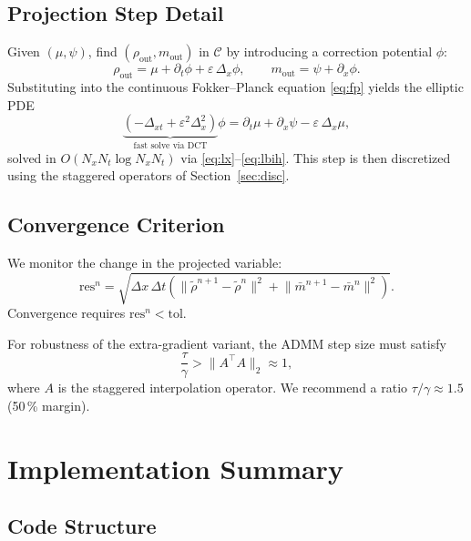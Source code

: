 \documentclass[11pt]{article}
\newcommand{\Dx}{\Delta_x}          %
\newcommand{\Dxt}{\Delta_{xt}}      %
\begin{document}
\subsection{Projection Step Detail}

Given $(\mu,\psi)$, find $(\rho_{\text{out}}, m_{\text{out}})$ in
$\mathcal{C}$ by introducing a correction potential $\phi$:
%
\begin{equation}
  \rho_{\text{out}} = \mu + \partial_t\phi + \varepsilon\,\Dx\phi,
  \qquad
  m_{\text{out}}   = \psi + \partial_x\phi.
\end{equation}
%
Substituting into the continuous Fokker--Planck equation \eqref{eq:fp}
yields the elliptic PDE
%
\begin{equation}\label{eq:phi_pde}
  \underbrace{(-\Dxt + \varepsilon^2\Dx^2)}_{\text{fast solve via DCT}}\phi
  = \partial_t\mu + \partial_x\psi - \varepsilon\,\Dx\mu,
\end{equation}
%
solved in $O(N_xN_t\log N_xN_t)$ via \eqref{eq:lx}--\eqref{eq:lbih}.
This step is then discretized using the staggered operators of
Section~\ref{sec:disc}.

\subsection{Convergence Criterion}

We monitor the change in the projected variable:
\begin{equation}\label{eq:res}
  \text{res}^n =
  \sqrt{\Delta x\,\Delta t
    \left(\bigl\|\tilde\rho^{n+1} - \tilde\rho^n\bigr\|^2
        + \bigl\|\bar m^{n+1} - \bar m^n\bigr\|^2\right)}.
\end{equation}
Convergence requires $\text{res}^n < \text{tol}$.

For robustness of the extra-gradient variant, the ADMM step size must satisfy
\begin{equation}
  \frac{\tau}{\gamma} > \|A^\top A\|_2 \approx 1,
\end{equation}
where $A$ is the staggered interpolation operator.
We recommend a ratio $\tau/\gamma \approx 1.5$ (50\,\% margin).

\section{Implementation Summary}

\subsection{Code Structure}
\end{document}
